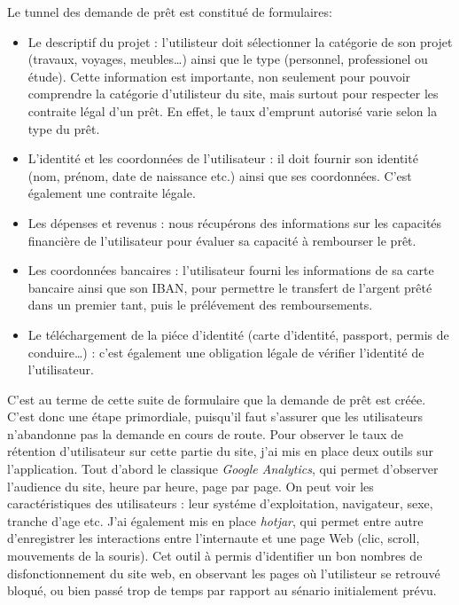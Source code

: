 \bigskip

Le tunnel des demande de prêt est constitué de formulaires:

\begin{itemize}
\tightlist
\item
  Le descriptif du projet : l'utilisteur doit sélectionner la catégorie
  de son projet (travaux, voyages, meubles\ldots{}) ainsi que le type
  (personnel, professionel ou étude). Cette information est importante,
  non seulement pour pouvoir comprendre la catégorie d'utilisteur du
  site, mais surtout pour respecter les contraite légal d'un prêt. En
  effet, le taux d'emprunt autorisé varie selon la type du prêt.
\item
  L'identité et les coordonnées de l'utilisateur : il doit fournir son
  identité (nom, prénom, date de naissance etc.) ainsi que ses
  coordonnées. C'est également une contraite légale.
\item
  Les dépenses et revenus : nous récupérons des informations sur les
  capacités financière de l'utilisateur pour évaluer sa capacité à
  rembourser le prêt.
\item
  Les coordonnées bancaires : l'utilisateur fourni les informations de
  sa carte bancaire ainsi que son IBAN, pour permettre le transfert de
  l'argent prêté dans un premier tant, puis le prélévement des
  remboursements.
\item
  Le téléchargement de la piéce d'identité (carte d'identité, passport,
  permis de conduire\ldots{}) : c'est également une obligation légale de
  vérifier l'identité de l'utilisateur.
\end{itemize}

\bigskip

C'est au terme de cette suite de formulaire que la demande de prêt est
créée. C'est donc une étape primordiale, puisqu'il faut s'assurer que
les utilisateurs n'abandonne pas la demande en cours de route. Pour
observer le taux de rétention d'utilisateur sur cette partie du site,
j'ai mis en place deux outils sur l'application. Tout d'abord le
classique \emph{Google Analytics}, qui permet d'observer l'audience du
site, heure par heure, page par page. On peut voir les caractéristiques
des utilisateurs : leur systéme d'exploitation, navigateur, sexe,
tranche d'age etc. J'ai également mis en place \emph{hotjar}, qui permet
entre autre d'enregistrer les interactions entre l'internaute et une
page Web (clic, scroll, mouvements de la souris). Cet outil à permis
d'identifier un bon nombres de disfonctionnement du site web, en
observant les pages où l'utilisteur se retrouvé bloqué, ou bien passé
trop de temps par rapport au sénario initialement prévu.

